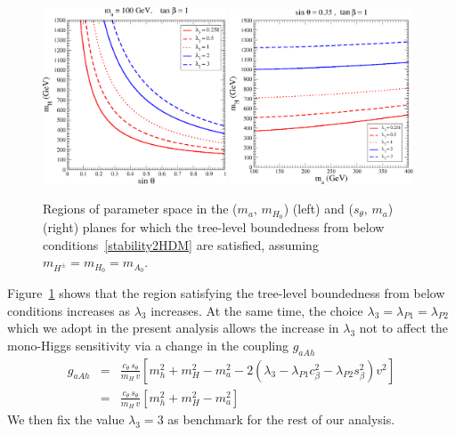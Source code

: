     \begin{figure}[h!]
\begin{center}
\includegraphics[width=0.485\textwidth]{texinputs/03_theoparameters/Figs/Plot_Eq.pdf}
\includegraphics[width=0.485\textwidth]{texinputs/03_theoparameters/Figs/Plot_ma.pdf}
\caption{\small Regions of parameter space in the 
    ($m_a,\, m_{H_0}$) (left) and ($s_{\theta},\, m_a$) (right) planes for which the tree-level boundedness from below conditions~\ref{stability2HDM}
    are satisfied, assuming $m_{H^{\pm}} = m_{H_0} = m_{A_0}$. 
}
\label{Fig_Stability}
\end{center}

\vspace{-2mm}

\end{figure}
    
    Figure~\ref{Fig_Stability} shows that the region satisfying the tree-level boundedness from below conditions increases as $\lambda_3$ increases. At the same time, 
    the choice $\lambda_3 = \lambda_{P1} = \lambda_{P2}$ which we adopt in the present analysis allows the increase in $\lambda_3$  not to affect the mono-Higgs sensitivity
    via a change in the coupling $g_{aAh}$
    \begin{eqnarray}
     g_{aAh} &=& \frac{c_{\theta} \,s_{\theta}}{m_{H} \,v} \left[m_h^2 + m_H^2 -m_a^2 - 2 
     (\lambda_3 - \lambda_{P1} c_{\beta}^2 - \lambda_{P2} s_{\beta}^2) v^2 \right] \nonumber \\
      &=& \frac{c_{\theta} \,s_{\theta}}{m_{H} \,v} \left[m_h^2 + m_H^2 -m_a^2 \right] 
    \end{eqnarray}
    We then fix the value $\lambda_3 = 3$ as benchmark for the rest of our analysis. 
    
